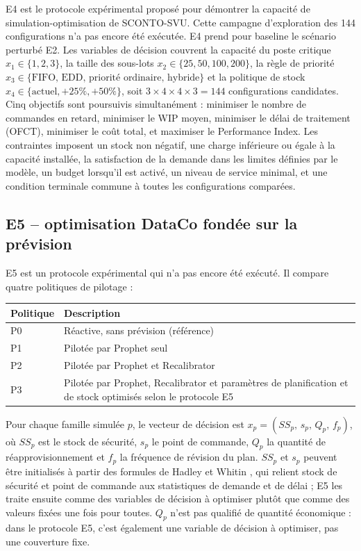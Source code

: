\documentclass[11pt,a4paper]{article}
\begin{document}
E4 est le protocole expérimental proposé pour démontrer la capacité de simulation-optimisation de SCONTO-SVU. Cette campagne d'exploration des 144 configurations n'a pas encore été exécutée. E4 prend pour baseline le scénario perturbé E2. Les variables de décision couvrent la capacité du poste critique $x_1\in\{1,2,3\}$, la taille des sous-lots $x_2\in\{25,50,100,200\}$, la règle de priorité $x_3\in\{\text{FIFO, EDD, priorité ordinaire, hybride}\}$ et la politique de stock $x_4\in\{\text{actuel},+25\%,+50\%\}$, soit $3\times4\times4\times3=144$ configurations candidates. Cinq objectifs sont poursuivis simultanément : minimiser le nombre de commandes en retard, minimiser le WIP moyen, minimiser le délai de traitement (OFCT), minimiser le coût total, et maximiser le Performance Index. Les contraintes imposent un stock non négatif, une charge inférieure ou égale à la capacité installée, la satisfaction de la demande dans les limites définies par le modèle, un budget lorsqu'il est activé, un niveau de service minimal, et une condition terminale commune à toutes les configurations comparées.

\subsection{E5 -- optimisation DataCo fondée sur la prévision}

E5 est un protocole expérimental qui n'a pas encore été exécuté. Il compare quatre politiques de pilotage :

\begin{center}
\small
\begin{tabularx}{0.92\textwidth}{lX}
\toprule
Politique & Description \\
\midrule
P0 & Réactive, sans prévision (référence) \\
P1 & Pilotée par Prophet seul \\
P2 & Pilotée par Prophet et Recalibrator \\
P3 & Pilotée par Prophet, Recalibrator et paramètres de planification et de stock optimisés selon le protocole E5 \\
\bottomrule
\end{tabularx}
\end{center}

Pour chaque famille simulée $p$, le vecteur de décision est $x_p=(SS_p,\,s_p,\,Q_p,\,f_p)$, où $SS_p$ est le stock de sécurité, $s_p$ le point de commande, $Q_p$ la quantité de réapprovisionnement et $f_p$ la fréquence de révision du plan. $SS_p$ et $s_p$ peuvent être initialisés à partir des formules de Hadley et Whitin \cite{hadleywhitin1963}, qui relient stock de sécurité et point de commande aux statistiques de demande et de délai ; E5 les traite ensuite comme des variables de décision à optimiser plutôt que comme des valeurs fixées une fois pour toutes. $Q_p$ n'est pas qualifié de quantité économique : dans le protocole E5, c'est également une variable de décision à optimiser, pas une couverture fixe.
\end{document}
